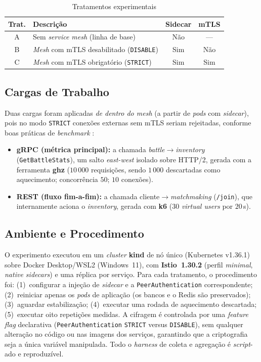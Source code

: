 \documentclass[12pt]{article}
\begin{document}
\begin{table}[ht]
\centering
\caption{Tratamentos experimentais}
\label{tab:tratamentos}
\begin{tabular}{@{}clcc@{}}
\toprule
\textbf{Trat.} & \textbf{Descri\c{c}\~ao} & \textbf{Sidecar} & \textbf{mTLS} \\
\midrule
A & Sem \textit{service mesh} (linha de base) & N\~ao & --- \\
B & \textit{Mesh} com mTLS desabilitado (\texttt{DISABLE}) & Sim & N\~ao \\
C & \textit{Mesh} com mTLS obrigat\'orio (\texttt{STRICT}) & Sim & Sim \\
\bottomrule
\end{tabular}
\end{table}

\subsection{Cargas de Trabalho}
Duas cargas foram aplicadas \emph{de dentro do \textit{mesh}} (a partir de \textit{pods} com \textit{sidecar}), pois no modo \texttt{STRICT} conex\~oes externas sem mTLS seriam rejeitadas, conforme boas pr\'aticas de \textit{benchmark} \cite{istioperf}:
\begin{itemize}
  \item \textbf{gRPC (m\'etrica principal):} a chamada \textit{battle}$\rightarrow$\textit{inventory} (\texttt{GetBattleStats}), um salto \textit{east-west} isolado sobre HTTP/2, gerada com a ferramenta \textbf{ghz} \cite{ghz} ($10\,000$ requisi\c{c}\~oes, sendo $1\,000$ descartadas como aquecimento; concorr\^encia $50$; $10$ conex\~oes).
  \item \textbf{REST (fluxo fim-a-fim):} a chamada cliente$\rightarrow$\textit{matchmaking} (\texttt{/join}), que internamente aciona o \textit{inventory}, gerada com \textbf{k6} \cite{k6} ($30$ \textit{virtual users} por $20$\,s).
\end{itemize}

\subsection{Ambiente e Procedimento}
O experimento executou em um \textit{cluster} \textbf{kind} \cite{kind} de n\'o \'unico (Kubernetes v1.36.1) sobre Docker Desktop/WSL2 (Windows~11), com \textbf{Istio~1.30.2} (perfil \textit{minimal}, \textit{native sidecars}) e uma r\'eplica por servi\c{c}o. Para cada tratamento, o procedimento foi: (1)~configurar a inje\c{c}\~ao de \textit{sidecar} e a \texttt{PeerAuthentication} correspondente; (2)~reiniciar apenas os \textit{pods} de aplica\c{c}\~ao (os bancos e o Redis s\~ao preservados); (3)~aguardar estabiliza\c{c}\~ao; (4)~executar uma rodada de aquecimento descartada; (5)~executar oito repeti\c{c}\~oes medidas. A cifragem \'e controlada por uma \textit{feature flag} declarativa (\texttt{PeerAuthentication} \texttt{STRICT} versus \texttt{DISABLE}), sem qualquer altera\c{c}\~ao no c\'odigo ou nas imagens dos servi\c{c}os, garantindo que a criptografia seja a \'unica vari\'avel manipulada. Todo o \textit{harness} de coleta e agrega\c{c}\~ao \'e \textit{script}-ado e reproduz\'ivel.
\end{document}
